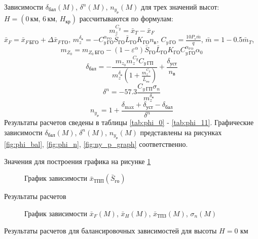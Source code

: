 Зависимости $\delta_{бал}(M)$, $\delta^n(M)$, $n_{y_р}(M)$ для трех значений
высот: $H=(0 \, км,\, 6 \, км,\, H_{кр})$ рассчитываются по формулам:
\[
    m_z^{C_y} = \bar{x}_T - \bar{x}_F
\]
$\bar{x}_{F} = \bar{x}_{F\, БГО} + \Delta \bar{x}_{F\, ГО}$, $m_z^{\delta_в} = 
-C_{y\, {ГО}}^{\alpha_{ГО}} \bar{S}_{ГО} \bar{L}_{ГО} K_{ГО} n_в$, $C_{y\, {ГО}}
= \frac{10 P_s \bar{m}}{q}$, $\bar{m} = 1 - 0.5 \bar{m}_{T}$,
\[
    m_{Z_0} = m_{Z_0\, БГО} - 
    (1-\varepsilon^\alpha)\bar{S}_{ГО} \bar{L}_{ГО} K_{ГО} C_{y\,{ГО}}^{\alpha_{ГО}}
    \alpha_0
\]
\[
    \delta_{бал}  = - \frac{m_{z_0} m_z^{C_y} C_{y\, {ГП}}}{ m_z^{\delta_в}
    \left(1 + \frac{m_z^{C_y}}{\bar{L}_{го}}\right)} + \frac{\delta_{уст}}{n_в}
\]
\[
    \delta^n = -57.3 \frac{C_{y\, ГП} \sigma_n}{ m_z^{\delta_в}}
\]
\[
    n_{y_р} = 1 + \frac{\delta_{\max} + \delta_{уст} - \delta_{бал}}{\delta^n}
\]
Результаты расчетов сведены в таблицы \ref{tab:phi_0} - \ref{tab:phi_11}.
Графические зависимости $\delta_{бал}(M)$, $\delta^n(M)$, $n_{y_{р}}(M)$
представлены на рисунках \ref{fig:phi_bal}, \ref{fig:phi_n},
\ref{fig:ny_p_graph} соответственно.

\begin{table}[H]
    \centering
    \caption{Значения для построения графика на рисунке \ref{fig:xTP}}
    \label{tab:otn_S_go}
    
\end{table}
\begin{figure}[H]
\centering
\resizebox{.79\linewidth}{!}{}
\caption{График зависимости $\bar{x}_{ТПП}(\bar{S}_{го})$} 
\label{fig:xTP}
\end{figure}

\begin{table}[H]
    \centering
    \caption{Результаты расчетов}
    \label{tab:sigmas}
    
\end{table}

\begin{figure}[H]
\centering
\resizebox{.79\linewidth}{!}{}
\caption{График зависимости $\bar{x}_{F}(M)$, $\bar{x}_{H}(M)$, $\bar{x}_{ТПЗ}(M)$, $\sigma_{n}(M)$}
\label{fig:xis_sigma}
\end{figure}


\begin{table}[H]
    \centering
    \caption{Результаты расчетов для балансировочных зависимостей для высоты
    $H=0$ км}
    \label{tab:phi_0}
    
\end{table}

